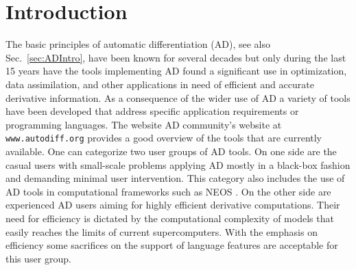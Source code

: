 \documentclass[11pt]{article}
\newcommand{\refsec}[1]{{Sec.~\ref{#1}}}
\begin{document}

\section{Introduction} \label{sec:Introduction}

The basic principles of automatic differentiation (AD), see also \refsec{sec:ADIntro}, 
have been known for several decades \cite{wengert}
but only during the last 15 years have the tools implementing AD found a significant use in 
optimization, data assimilation, and other applications in need of efficient and accurate 
derivative information. 
As a consequence of the wider use of AD 
a variety of tools have been developed that address specific 
application requirements or programming languages. 
The website AD community's website 
at {\tt www.autodiff.org} provides a good overview of the tools that 
are currently available. 
One can categorize two user groups of AD tools. 
On one side are the casual users 
with small-scale problems applying AD mostly in a black-box fashion 
and demanding minimal user intervention. 
This category also includes the use of AD tools in  computational 
frameworks such as NEOS \cite{neosWeb}.
On the other side are experienced AD users aiming for highly efficient 
derivative computations.
Their need for efficiency is dictated by the 
computational complexity of models that easily reaches the limits of  current 
supercomputers. 
With the emphasis on efficiency some sacrifices on the support of 
language features are acceptable for this user group. 
\end{document}
